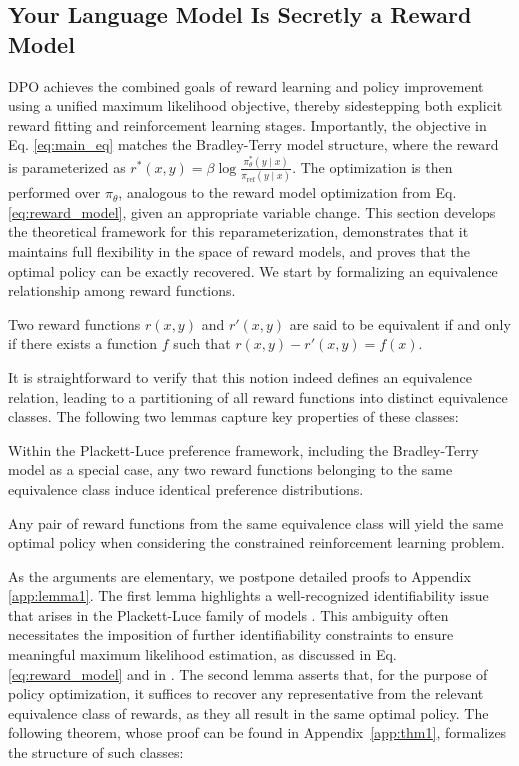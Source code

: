 \label{sec:theory}

\subsection{Your Language Model Is Secretly a Reward Model} DPO achieves the combined goals of reward learning and policy improvement using a unified maximum likelihood objective, thereby sidestepping both explicit reward fitting and reinforcement learning stages. Importantly, the objective in Eq. \ref{eq:main_eq} matches the Bradley-Terry model structure, where the reward is parameterized as $r^*(x, y) = \beta \log\frac{\pi^*_\theta(y \mid x)}{\pi_\text{ref}(y \mid x)}$. The optimization is then performed over $\pi_\theta$, analogous to the reward model optimization from Eq. \ref{eq:reward_model}, given an appropriate variable change. This section develops the theoretical framework for this reparameterization, demonstrates that it maintains full flexibility in the space of reward models, and proves that the optimal policy can be exactly recovered. We start by formalizing an equivalence relationship among reward functions.

\begin{definition}
Two reward functions $r(x, y)$ and $r'(x, y)$ are said to be equivalent if and only if there exists a function $f$ such that ${r(x, y)-r'(x, y) = f(x)}$.
\end{definition}

It is straightforward to verify that this notion indeed defines an equivalence relation, leading to a partitioning of all reward functions into distinct equivalence classes. The following two lemmas capture key properties of these classes:

\begin{lemma}\label{lemma:same_prefrence} 
Within the Plackett-Luce preference framework, including the Bradley-Terry model as a special case, any two reward functions belonging to the same equivalence class induce identical preference distributions.
\end{lemma}

\begin{lemma}\label{lemma:same_policy}
    Any pair of reward functions from the same equivalence class will yield the same optimal policy when considering the constrained reinforcement learning problem.
\end{lemma}

As the arguments are elementary, we postpone detailed proofs to Appendix \ref{app:lemma1}. The first lemma highlights a well-recognized identifiability issue that arises in the Plackett-Luce family of models \cite{plackett1975analysis}. This ambiguity often necessitates the imposition of further identifiability constraints to ensure meaningful maximum likelihood estimation, as discussed in Eq. \ref{eq:reward_model} and in \cite{bong2022generalized}. The second lemma asserts that, for the purpose of policy optimization, it suffices to recover any representative from the relevant equivalence class of rewards, as they all result in the same optimal policy. The following theorem, whose proof can be found in Appendix~\ref{app:thm1}, formalizes the structure of such classes:


